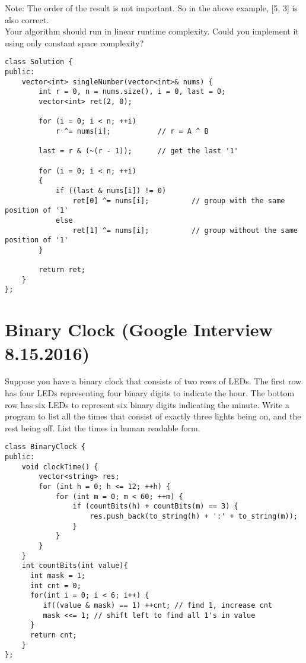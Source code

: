 Note:
    The order of the result is not important. So in the above example, [5, 3] is also correct.\\
    Your algorithm should run in linear runtime complexity. Could you implement it using only constant space complexity?\\

\begin{lstlisting}
class Solution {
public:
    vector<int> singleNumber(vector<int>& nums) {
        int r = 0, n = nums.size(), i = 0, last = 0;
        vector<int> ret(2, 0);

        for (i = 0; i < n; ++i) 
            r ^= nums[i];           // r = A ^ B

        last = r & (~(r - 1));      // get the last '1'
        
        for (i = 0; i < n; ++i)
        {
            if ((last & nums[i]) != 0)
                ret[0] ^= nums[i];          // group with the same position of '1'
            else
                ret[1] ^= nums[i];          // group without the same position of '1'
        }

        return ret;
    }
};
\end{lstlisting}


\section{Binary Clock (Google Interview 8.15.2016)}
Suppose you have a binary clock that consists of two rows of LEDs. The first row has four LEDs representing four binary digits to indicate the hour. The bottom row has six LEDs to represent six binary digits indicating the minute. Write a program to list all the times that consist of exactly three lights being on, and the rest being off. List the times in human readable form.\\

\begin{lstlisting}
class BinaryClock {
public:
    void clockTime() {
        vector<string> res;
        for (int h = 0; h <= 12; ++h) {
            for (int m = 0; m < 60; ++m) {
                if (countBits(h) + countBits(m) == 3) {
                    res.push_back(to_string(h) + ':' + to_string(m));
                }
            }
        }
    }
    int countBits(int value){
      int mask = 1;
      int cnt = 0;
      for(int i = 0; i < 6; i++) {
         if((value & mask) == 1) ++cnt; // find 1, increase cnt
         mask <<= 1; // shift left to find all 1's in value
      }
      return cnt;       
    }
};
\end{lstlisting}

